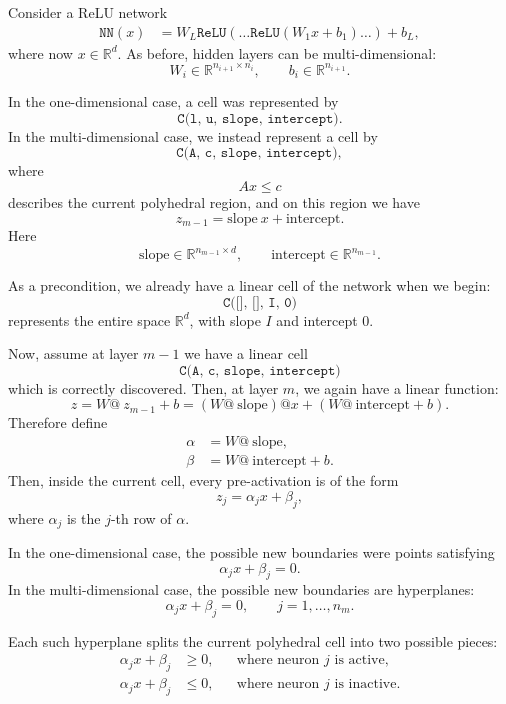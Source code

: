 \documentclass[10pt]{extarticle}
\begin{document}
Consider a ReLU network
\begin{align}
\texttt{NN}(x) &= W_L\texttt{ReLU}(\ldots\texttt{ReLU}(W_1x+b_1)\ldots)+b_L,
\end{align}
where now $x \in \mathbb{R}^{d}$.  As before, hidden layers can be multi-dimensional:
\[
W_i \in \mathbb{R}^{n_{i+1}\times n_i},
\qquad
b_i \in \mathbb{R}^{n_{i+1}}.
\]

In the one-dimensional case, a cell was represented by
\[
\texttt{C(l, u, slope, intercept)}.
\]
In the multi-dimensional case, we instead represent a cell by
\[
\texttt{C(A, c, slope, intercept)},
\]
where
\[
A x \leq c
\]
describes the current polyhedral region, and on this region we have
\[
z_{m-1} = \text{slope} \ x + \text{intercept}.
\]
Here
\[
\text{slope} \in \mathbb{R}^{n_{m-1}\times d},
\qquad
\text{intercept} \in \mathbb{R}^{n_{m-1}}.
\]

As a precondition, we already have a linear cell of the network when we begin:
\[
\texttt{C([], [], I, 0)}
\]
represents the entire space $\mathbb{R}^d$, with slope $I$ and intercept $0$.

Now, assume at layer $m-1$ we have a linear cell
\[
\texttt{C(A, c, slope, intercept)}
\]
which is correctly discovered.  Then, at layer $m$, we again have a linear function:
\begin{equation}
z = W \texttt{@} \ z_{m-1} + b
= (W \texttt{@} \ \text{slope}) \texttt{@} x
+ (W \texttt{@} \ \text{intercept} + b).
\end{equation}
Therefore define
\begin{align}
\alpha &= W \texttt{@} \ \text{slope}, \\
\beta  &= W \texttt{@} \ \text{intercept} + b.
\end{align}
Then, inside the current cell, every pre-activation is of the form
\begin{equation}
z_j = \alpha_j x + \beta_j,
\end{equation}
where $\alpha_j$ is the $j$-th row of $\alpha$.

In the one-dimensional case, the possible new boundaries were points satisfying
\[
\alpha_j x + \beta_j = 0.
\]
In the multi-dimensional case, the possible new boundaries are hyperplanes:
\begin{equation}
\alpha_j x + \beta_j = 0,
\qquad j=1,\ldots,n_m.
\end{equation}

Each such hyperplane splits the current polyhedral cell into two possible pieces:
\begin{align}
\alpha_j x + \beta_j &\geq 0,
&&\text{where neuron } j \text{ is active}, \\
\alpha_j x + \beta_j &\leq 0,
&&\text{where neuron } j \text{ is inactive}.
\end{align}
\end{document}
